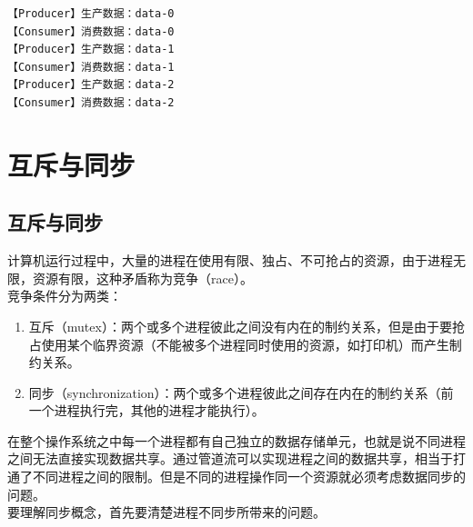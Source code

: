\begin{tcolorbox}
    \begin{verbatim}
【Producer】生产数据：data-0
【Consumer】消费数据：data-0
【Producer】生产数据：data-1
【Consumer】消费数据：data-1
【Producer】生产数据：data-2
【Consumer】消费数据：data-2
	\end{verbatim}
\end{tcolorbox}

\newpage

\section{互斥与同步}

\subsection{互斥与同步}

计算机运行过程中，大量的进程在使用有限、独占、不可抢占的资源，由于进程无限，资源有限，这种矛盾称为竞争（race）。\\

竞争条件分为两类：

\begin{enumerate}
    \item 互斥（mutex）：两个或多个进程彼此之间没有内在的制约关系，但是由于要抢占使用某个临界资源（不能被多个进程同时使用的资源，如打印机）而产生制约关系。

    \item 同步（synchronization）：两个或多个进程彼此之间存在内在的制约关系（前一个进程执行完，其他的进程才能执行）。
\end{enumerate}

在整个操作系统之中每一个进程都有自己独立的数据存储单元，也就是说不同进程之间无法直接实现数据共享。通过管道流可以实现进程之间的数据共享，相当于打通了不同进程之间的限制。但是不同的进程操作同一个资源就必须考虑数据同步的问题。\\

要理解同步概念，首先要清楚进程不同步所带来的问题。\\


